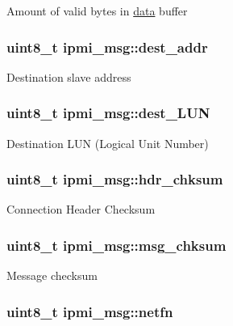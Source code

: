 Amount of valid bytes in \hyperlink{structipmi__msg_a1151a6e64b5aed9d45abf0a92177a3fd}{data} buffer \hypertarget{structipmi__msg_ac2558cc703217e0716748389e27e761e}{
\subsubsection[{dest\-\_\-addr}]{\setlength{\rightskip}{0pt plus 5cm}uint8\-\_\-t ipmi\-\_\-msg\-::dest\-\_\-addr}}\label{structipmi__msg_ac2558cc703217e0716748389e27e761e}
Destination slave address \hypertarget{structipmi__msg_a224663171803faefb5826aec006cf143}{
\subsubsection[{dest\-\_\-\-L\-U\-N}]{\setlength{\rightskip}{0pt plus 5cm}uint8\-\_\-t ipmi\-\_\-msg\-::dest\-\_\-\-L\-U\-N}}\label{structipmi__msg_a224663171803faefb5826aec006cf143}
Destination L\-U\-N (Logical Unit Number) \hypertarget{structipmi__msg_acaee5f5293078d1253b08371547b640d}{
\subsubsection[{hdr\-\_\-chksum}]{\setlength{\rightskip}{0pt plus 5cm}uint8\-\_\-t ipmi\-\_\-msg\-::hdr\-\_\-chksum}}\label{structipmi__msg_acaee5f5293078d1253b08371547b640d}
Connection Header Checksum \hypertarget{structipmi__msg_ad51dafec9dccf98423ec918685c865b4}{
\subsubsection[{msg\-\_\-chksum}]{\setlength{\rightskip}{0pt plus 5cm}uint8\-\_\-t ipmi\-\_\-msg\-::msg\-\_\-chksum}}\label{structipmi__msg_ad51dafec9dccf98423ec918685c865b4}
Message checksum \hypertarget{structipmi__msg_a47f4c1948609eff0cb5e3e86523118aa}{
\subsubsection[{netfn}]{\setlength{\rightskip}{0pt plus 5cm}uint8\-\_\-t ipmi\-\_\-msg\-::netfn}}\label{structipmi__msg_a47f4c1948609eff0cb5e3e86523118aa}
